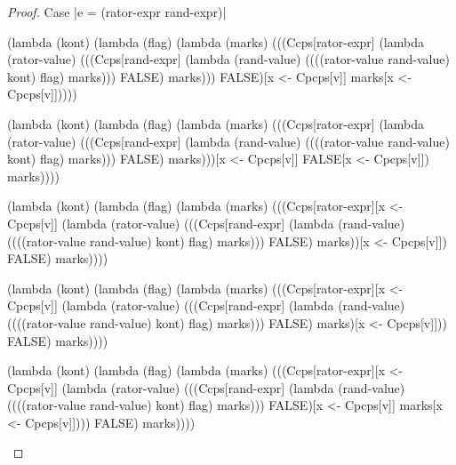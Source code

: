 \begin{proof}{Case \scheme|e = (rator-expr rand-expr)|}
\begin{schemeblock}
\begin{schemedisplay}
(lambda (kont)
   (lambda (flag)
     (lambda (marks)
       (((Ccps[rator-expr]
          (lambda (rator-value)
            (((Ccps[rand-expr]
               (lambda (rand-value)
                 ((((rator-value rand-value) kont) flag) marks)))
              FALSE) marks)))
         FALSE)[x <- Cpcps[v]] marks[x <- Cpcps[v]]))))
\end{schemedisplay}
\end{schemeblock}

\begin{schemeblock}
\begin{schemedisplay}
(lambda (kont)
   (lambda (flag)
     (lambda (marks)
       (((Ccps[rator-expr]
          (lambda (rator-value)
            (((Ccps[rand-expr]
               (lambda (rand-value)
                 ((((rator-value rand-value) kont) flag) marks)))
              FALSE) marks)))[x <- Cpcps[v]]
         FALSE[x <- Cpcps[v]]) marks))))
\end{schemedisplay}
\end{schemeblock}

\begin{schemeblock}
\begin{schemedisplay}
(lambda (kont)
   (lambda (flag)
     (lambda (marks)
       (((Ccps[rator-expr][x <- Cpcps[v]]
          (lambda (rator-value)
            (((Ccps[rand-expr]
               (lambda (rand-value)
                 ((((rator-value rand-value) kont) flag) marks)))
              FALSE) marks))[x <- Cpcps[v]])
         FALSE) marks))))
\end{schemedisplay}
\end{schemeblock}

\begin{schemeblock}
\begin{schemedisplay}
(lambda (kont)
   (lambda (flag)
     (lambda (marks)
       (((Ccps[rator-expr][x <- Cpcps[v]]
          (lambda (rator-value)
            (((Ccps[rand-expr]
               (lambda (rand-value)
                 ((((rator-value rand-value) kont) flag) marks)))
              FALSE) marks)[x <- Cpcps[v]]))
         FALSE) marks))))
\end{schemedisplay}
\end{schemeblock}

\begin{schemeblock}
\begin{schemedisplay}
(lambda (kont)
   (lambda (flag)
     (lambda (marks)
       (((Ccps[rator-expr][x <- Cpcps[v]]
          (lambda (rator-value)
            (((Ccps[rand-expr]
               (lambda (rand-value)
                 ((((rator-value rand-value) kont) flag) marks)))
              FALSE)[x <- Cpcps[v]] marks[x <- Cpcps[v]])))
         FALSE) marks))))
\end{schemedisplay}
\end{schemeblock}


\end{proof}
